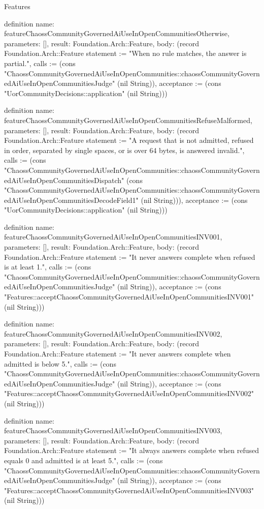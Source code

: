 \begin{lexlean}{Features}
\begin{semanticmodule}
definition{
  name: featureChaossCommunityGovernedAiUseInOpenCommunitiesOtherwise,
  parameters: [],
  result: Foundation.Arch::Feature,
  body: (record Foundation.Arch::Feature {statement := "When no rule matches, the answer is partial.", calls := (cons "ChaossCommunityGovernedAiUseInOpenCommunities::chaossCommunityGovernedAiUseInOpenCommunitiesJudge" (nil String)), acceptance := (cons "UorCommunityDecisions::application" (nil String))})
}

definition{
  name: featureChaossCommunityGovernedAiUseInOpenCommunitiesRefuseMalformed,
  parameters: [],
  result: Foundation.Arch::Feature,
  body: (record Foundation.Arch::Feature {statement := "A request that is not admitted, refused in order, separated by single spaces, or is over 64 bytes, is answered invalid.", calls := (cons "ChaossCommunityGovernedAiUseInOpenCommunities::chaossCommunityGovernedAiUseInOpenCommunitiesDispatch" (cons "ChaossCommunityGovernedAiUseInOpenCommunities::chaossCommunityGovernedAiUseInOpenCommunitiesDecodeField1" (nil String))), acceptance := (cons "UorCommunityDecisions::application" (nil String))})
}

definition{
  name: featureChaossCommunityGovernedAiUseInOpenCommunitiesINV001,
  parameters: [],
  result: Foundation.Arch::Feature,
  body: (record Foundation.Arch::Feature {statement := "It never answers complete when refused is at least 1.", calls := (cons "ChaossCommunityGovernedAiUseInOpenCommunities::chaossCommunityGovernedAiUseInOpenCommunitiesJudge" (nil String)), acceptance := (cons "Features::acceptChaossCommunityGovernedAiUseInOpenCommunitiesINV001" (nil String))})
}

definition{
  name: featureChaossCommunityGovernedAiUseInOpenCommunitiesINV002,
  parameters: [],
  result: Foundation.Arch::Feature,
  body: (record Foundation.Arch::Feature {statement := "It never answers complete when admitted is below 5.", calls := (cons "ChaossCommunityGovernedAiUseInOpenCommunities::chaossCommunityGovernedAiUseInOpenCommunitiesJudge" (nil String)), acceptance := (cons "Features::acceptChaossCommunityGovernedAiUseInOpenCommunitiesINV002" (nil String))})
}

definition{
  name: featureChaossCommunityGovernedAiUseInOpenCommunitiesINV003,
  parameters: [],
  result: Foundation.Arch::Feature,
  body: (record Foundation.Arch::Feature {statement := "It always answers complete when refused equals 0 and admitted is at least 5.", calls := (cons "ChaossCommunityGovernedAiUseInOpenCommunities::chaossCommunityGovernedAiUseInOpenCommunitiesJudge" (nil String)), acceptance := (cons "Features::acceptChaossCommunityGovernedAiUseInOpenCommunitiesINV003" (nil String))})
}


\end{semanticmodule}
\end{lexlean}
